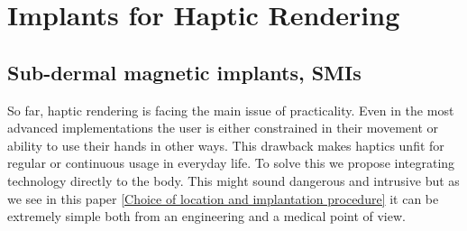 \documentclass[10pt,journal,compsoc]{IEEEtran}
\begin{document}
%	

\section{Implants for Haptic Rendering}
\label{sec:implants}

\subsection{Sub-dermal magnetic implants, SMIs}

So far, haptic rendering is facing the main issue of practicality. Even in the most advanced implementations the user is either constrained in their movement or ability to use their hands in other ways. This drawback makes haptics unfit for regular or continuous usage in everyday life. 
	To solve this we propose integrating technology directly to the body. This might sound dangerous and intrusive but as we see in this paper \ref{Choice of location and implantation procedure} it can be extremely simple both from an engineering and a medical point of view.
	
\end{document}
